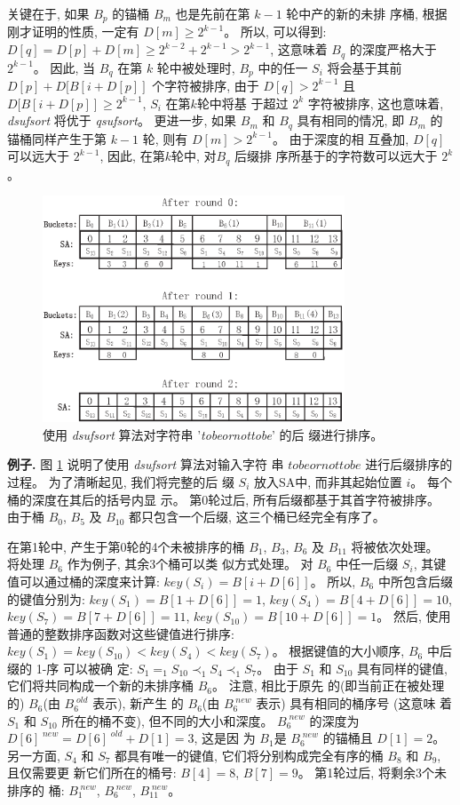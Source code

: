 关键在于, 如果 $B_p$ 的锚桶 $B_m$ 也是先前在第 $k-1$ 轮中产的新的未排
序桶, 根据刚才证明的性质, 一定有 $D[m] \geq 2^{k-1}$。 所以, 可以得到:
$D[q] = D[p] + D[m] \geq 2^{k-2} + 2^{k-1} > 2^{k-1}$, 这意味着 $B_q$
的深度严格大于 $2^{k-1}$。 因此, 当 $B_q$ 在第 $k$ 轮中被处理时, $B_p$
中的任一 $S_i$ 将会基于其前 $D[p] + D[B[i+D[p]]$ 个字符被排序, 由于
$D[q] > 2^{k-1}$ 且 $D[B[i+D[p]] \geq 2^{k-1}$, $S_i$ 在第$k$轮中将基
于超过 $2^k$ 字符被排序, 这也意味着, \emph{dsufsort} 将优于
\emph{qsufsort}。 更进一步, 如果 $B_m$ 和 $B_q$ 具有相同的情况, 即
$B_m$ 的锚桶同样产生于第 $k-1$ 轮, 则有 $D[m] > 2^{k-1}$。 由于深度的相
互叠加, $D[q]$ 可以远大于 $2^{k-1}$, 因此, 在第$k$轮中, 对$B_q$ 后缀排
序所基于的字符数可以远大于 $2^k$。

\begin{figure}[!h]
\centering
\includegraphics[width=9cm]{figures/3_SS/p1}
\vspace*{8pt}
\caption{使用 \emph{dsufsort} 算法对字符串 '\emph{tobeornottobe}' 的后
  缀进行排序。}
\label{fig:1}
\end{figure}

\textbf{例子.} 图 \ref{fig:1} 说明了使用 \emph{dsufsort} 算法对输入字符
串 $tobeornottobe$ 进行后缀排序的过程。 为了清晰起见, 我们将完整的后
缀 $S_i$ 放入SA中, 而非其起始位置 $i$。 每个桶的深度在其后的括号内显
示。 第0轮过后, 所有后缀都基于其首字符被排序。 由于桶 $B_0$,
$B_5$ 及 $B_{10}$ 都只包含一个后缀, 这三个桶已经完全有序了。

在第1轮中, 产生于第0轮的4个未被排序的桶 $B_1$, $B_3$,
$B_6$ 及 $B_{11}$ 将被依次处理。 将处理 $B_6$ 作为例子, 其余3个桶可以类
似方式处理。 对 $B_6$ 中任一后缀 $S_i$, 其键值可以通过桶的深度来计算:
$key(S_i) = B[i+D[6]]$。 所以, $B_6$ 中所包含后缀的键值分别为:
$key(S_1) = B[1+D[6]] = 1$, $key(S_4) = B[4+D[6]] = 10$,
$key(S_7) = B[7+D[6]] = 11$, $key(S_{10}) = B[10+D[6]] = 1$。 然后, 使用
普通的整数排序函数对这些键值进行排序: $key(S_1) = key(S_{10}) <
key(S_4) < key(S_7)$。  根据键值的大小顺序, $B_6$ 中后缀的 1-序 可以被确
定: $S_1 =_ 1 S_{10} \prec_1 S_4 \prec_1 S_7$。 由于 $S_1$ 和 $S_{10}$
具有同样的键值, 它们将共同构成一个新的未排序桶 $B_6$。 注意, 相比于原先
的(即当前正在被处理的) $B_6$(由 $B_6^{\;old}$ 表示), 新产生
的 $B_6$(由 $B_6^{\;new}$ 表示) 具有相同的桶序号 (这意味
着 $S_1$ 和 $S_{10}$ 所在的桶不变), 但不同的大小和深度。 $B_6^{\;new}$
的深度为 $D[6]^{\;new} = D[6]^{\;old} + D[1] = 3$, 这是因
为 $B_1$是 $B_6^{\;new}$ 的锚桶且 $D[1] = 2$。 另一方面, $S_4$ 和 $S_7$
都具有唯一的键值, 它们将分别构成完全有序的桶 $B_8$ 和 $B_9$, 且仅需要更
新它们所在的桶号: $B[4] = 8$, $B[7] = 9$。 第1轮过后, 将剩余3个未排序的
桶: $B_1^{\;new}$, $B_6^{\;new}$, $B_{11}^{\;new}$。

